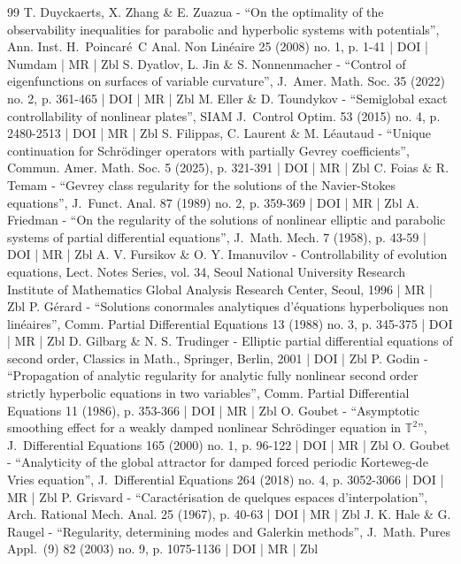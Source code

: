 \begin{thebibliography}{99}
T. Duyckaerts, X. Zhang \& E. Zuazua - “On the optimality of the observability inequalities for parabolic and hyperbolic systems with potentials”, Ann. Inst. H. Poincaré C Anal. Non Linéaire 25 (2008) no. 1, p. 1-41 | DOI | Numdam | MR | Zbl
S. Dyatlov, L. Jin \& S. Nonnenmacher - “Control of eigenfunctions on surfaces of variable curvature”, J. Amer. Math. Soc. 35 (2022) no. 2, p. 361-465 | DOI | MR | Zbl
M. Eller \& D. Toundykov - “Semiglobal exact controllability of nonlinear plates”, SIAM J. Control Optim. 53 (2015) no. 4, p. 2480-2513 | DOI | MR | Zbl
S. Filippas, C. Laurent \& M. Léautaud - “Unique continuation for Schrödinger operators with partially Gevrey coefficients”, Commun. Amer. Math. Soc. 5 (2025), p. 321-391 | DOI | MR | Zbl
C. Foias \& R. Temam - “Gevrey class regularity for the solutions of the Navier-Stokes equations”, J. Funct. Anal. 87 (1989) no. 2, p. 359-369 | DOI | MR | Zbl
A. Friedman - “On the regularity of the solutions of nonlinear elliptic and parabolic systems of partial differential equations”, J. Math. Mech. 7 (1958), p. 43-59 | DOI | MR | Zbl
A. V. Fursikov \& O. Y. Imanuvilov - Controllability of evolution equations, Lect. Notes Series, vol. 34, Seoul National University Research Institute of Mathematics Global Analysis Research Center, Seoul, 1996 | MR | Zbl
P. Gérard - “Solutions conormales analytiques d’équations hyperboliques non linéaires”, Comm. Partial Differential Equations 13 (1988) no. 3, p. 345-375 | DOI | MR | Zbl
D. Gilbarg \& N. S. Trudinger - Elliptic partial differential equations of second order, Classics in Math., Springer, Berlin, 2001 | DOI | Zbl
P. Godin - “Propagation of analytic regularity for analytic fully nonlinear second order strictly hyperbolic equations in two variables”, Comm. Partial Differential Equations 11 (1986), p. 353-366 | DOI | MR | Zbl
O. Goubet - “Asymptotic smoothing effect for a weakly damped nonlinear Schrödinger equation in $\mathbb{T}^2$”, J. Differential Equations 165 (2000) no. 1, p. 96-122 | DOI | MR | Zbl
O. Goubet - “Analyticity of the global attractor for damped forced periodic Korteweg-de Vries equation”, J. Differential Equations 264 (2018) no. 4, p. 3052-3066 | DOI | MR | Zbl
P. Grisvard - “Caractérisation de quelques espaces d’interpolation”, Arch. Rational Mech. Anal. 25 (1967), p. 40-63 | DOI | MR | Zbl
J. K. Hale \& G. Raugel - “Regularity, determining modes and Galerkin methods”, J. Math. Pures Appl. (9) 82 (2003) no. 9, p. 1075-1136 | DOI | MR | Zbl

\end{thebibliography}
